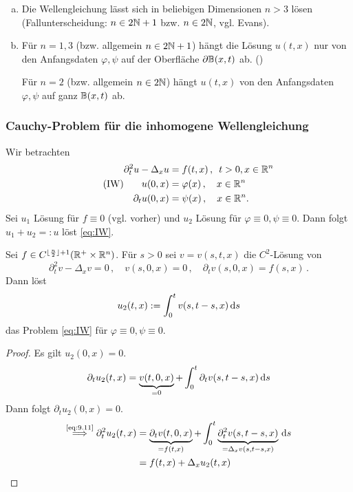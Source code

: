 \begin{bem}
\label{bem:9.8}
\begin{enumerate}[(a)]
\item Die Wellengleichung lässt sich in beliebigen Dimensionen $n>3$ lösen (Fallunterscheidung: $n \in 2\mathbb{N} +1$ bzw. $ n \in 2\mathbb{N}$, vgl. Evans).
\item Für $n = 1, 3$ (bzw. allgemein $n \in 2\mathbb{N} +1$) hängt die Lösung $u(t,x)$ nur von den Anfangsdaten $\varphi, \psi$ auf der Oberfläche $\partial \mathbb{B}(x,t)$ ab. ()

Für $n =2$ (bzw. allgemein $n \in 2\mathbb{N}$) hängt $u(t,x)$ von den Anfangsdaten $\varphi, \psi$ auf ganz $\mathbb{B}(x,t)$ ab.
\end{enumerate}
\end{bem}

\subsubsection{Cauchy-Problem für die inhomogene Wellengleichung}

Wir betrachten
\begin{align*}\label{eq:IW}\tag{IW}
\begin{aligned}
	\partial^2_t u - \Delta_x u &= f(t,x) \, , \, \, \,  t >0, x \in \mathbb{R}^n \\
	u(0,x) & = \varphi (x) \, , \quad x \in \mathbb{R}^n \\
	\partial_t u(0,x)& = \psi(x) \, , \quad x \in \mathbb{R}^n .
\end{aligned}
\end{align*}
Sei $u_1$ Lösung für $f\equiv 0$ (vgl. vorher) und $u_2$ Lösung für $\varphi \equiv 0, \psi \equiv 0$. Dann folgt $u_1+u_2 =: u$ löst \eqref{eq:IW}. 

\begin{satz}
\label{satz:9.9}
Sei $f\in C^{\lfloor \frac n2\rfloor +1} (\mathbb{R}^+ \times \mathbb{R}^n)$. Für $s>0$ sei $v = v(s,t,x)$ die $C^2$-Lösung von
\[
	\partial_t^2 v-\Delta_x v = 0\, ,\quad v(s,0,x) = 0\, ,\quad \partial_t v(s,0,x) = f(s,x)\, .
\]
Dann löst
\[
	u_2 (t,x) := \int_0^t v(s,t-s,x) \,\mathrm{d} s
\]
das Problem \eqref{eq:IW} für $\varphi\equiv 0, \psi \equiv 0$.
\end{satz}

\begin{proof}
Es gilt $u_2 (0,x) = 0$.
\begin{align}\label{eq:9.11}
	\partial_t u_2(t,x) = \underbrace{v(t,0,x)}_{=0} + \int_0^t \partial_t v(s,t-s,x)\,\mathrm{d} s
\end{align}
Dann folgt $\partial_t u_2(0,x) = 0$.
\begin{align*}
	\stackrel{\scriptsize\eqref{eq:9.11}}{\Longrightarrow} \partial_t^2 u_2(t,x) & = \underbrace{\partial_t v(t,0,x)}_{=f(t,x)} + \int_0^t \underbrace{\partial_t^2 v(s,t-s,x)}_{=\Delta_x v(s,t-s,x)} \,\mathrm{d} s \\
	& = f(t,x) + \Delta_x u_2 (t,x) \qedhere
\end{align*}
\end{proof}

